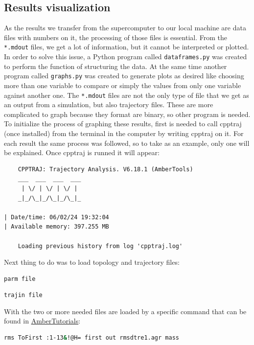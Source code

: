 \documentclass[a4paper]{article}
\begin{document}
\subsection{Results visualization}
As the results we transfer from the supercomputer to our local machine are data files with numbers on it, the processing of those files is essential. From the \texttt{*.mdout} files, we get a lot of information, but it cannot be interpreted or plotted. In order to solve this issue, a Python program called \texttt{dataframes.py} was created to perform the function of structuring the data. At the same time another program called \texttt{graphs.py} was created to generate plots as desired like choosing more than one variable to compare or simply the values from only one variable against another one. The \texttt{*.mdout} files are not the only type of file that we get as an output from a simulation, but also trajectory files. These are more complicated to graph because they format are binary, so other program is needed. To initialize the process of graphing these results, first is needed to call cpptraj (once installed) from the terminal in the computer by writing cpptraj on it.
For each result the same process was followed, so to take as an example, only one will be explained. Once cpptraj is runned it will appear:

\begin{verbatim}
    CPPTRAJ: Trajectory Analysis. V6.18.1 (AmberTools)
    ___  ___  ___  ___
     | \/ | \/ | \/ | 
    _|_/\_|_/\_|_/\_|_

| Date/time: 06/02/24 19:32:04
| Available memory: 397.255 MB

	Loading previous history from log 'cpptraj.log'

\end{verbatim}

Next thing to do was to load topology and trajectory files:

\begin{lstlisting}[language=Bash,caption={Loading topology file}]
    parm file
\end{lstlisting}
\begin{lstlisting}[language=Bash,caption={Loading trajectory file}]
    trajin file
\end{lstlisting}

With the two or more needed files are loaded by a specific command that can be found in \href{https://ambermd.org/tutorials/analysis/tutorial1/index.php}{AmberTutorials}:


\begin{lstlisting}[language=Bash,caption={RMSD command}]
    rms ToFirst :1-13&!@H= first out rmsdtre1.agr mass
\end{lstlisting}
\end{document}
